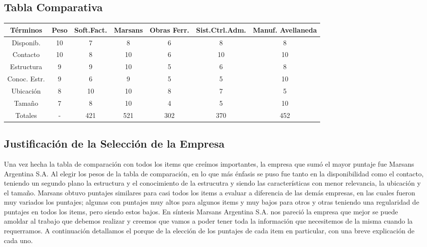 \documentclass[12pt,a4paper,spanish]{article}
\begin{document}
\subsection{Tabla Comparativa}

\small
\begin{center}
\begin{tabular}{|| c | c | c | c | c | c | c ||}
\hline
\hline
T\'{e}rminos & Peso & Soft.Fact. & Marsans & Obras Ferr. & Sist.Ctrl.Adm. & Manuf. Avellaneda\\
\hline
Disponib.  & 10 & 7 & 8 & 6 & 8 & 8 \\
\hline
Contacto   & 10 & 8 & 10 & 6 & 10 & 10 \\
\hline
Estructura & 9 & 9 & 10 & 5 & 6 & 8 \\
\hline
Conoc. Estr. & 9 & 6 & 9 & 5 & 5 & 10 \\
\hline
Ubicaci\'{o}n & 8 & 10 & 10 & 8 & 7 & 5 \\
\hline
Tama\~{n}o   & 7 & 8 & 10 & 4 & 5 & 10 \\
\hline
\hline
Totales & - & 421 & 521 & 302 & 370 & 452 \\
\hline

\end{tabular}
\end{center}

\subsection{Justificaci\'{o}n de la Selecci\'{o}n de la Empresa}

Una vez hecha la tabla de comparaci\'{o}n con todos los items que cre\'imos importantes, la empresa que sum\'o el mayor puntaje fue Marsans Argentina S.A.
Al elegir los pesos de la tabla de comparaci\'{o}n, en lo que m\'as \'enfasis se puso fue tanto en la disponibilidad como el contacto, teniendo un segundo plano la estructura y el conocimiento de la estrucutra y siendo las caracter\'isticas con menor relevancia, la ubicaci\'on y el tama\~no.
Marsans obtuvo puntajes similares para casi todos los items a evaluar a diferencia de las dem\'{a}s empresas, en las cuales fueron muy variados los puntajes; algunas con puntajes muy altos para algunos items y muy bajos para otros y otras teniendo una regularidad de puntajes en todos los items, pero siendo estos bajos.
En s\'{i}ntesis Marsans Argentina S.A. nos pareci\'{o} la empresa que mejor se puede amoldar al trabajo que debemos realizar y creemos que vamos a poder tener toda la informaci\'{o}n que necesitemos de la misma cuando la requerramos.
A continuaci\'{o}n detallamos el porque de la elecci\'{o}n de los puntajes de cada item en particular, con una breve explicaci\'{o}n de cada uno.
\end{document}
